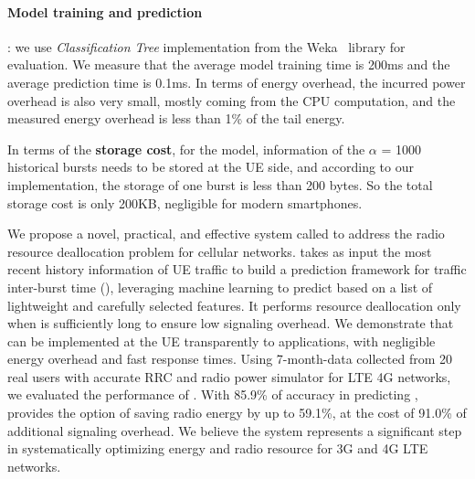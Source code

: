 \paragraph{Model training and prediction}: we use {\em Classification Tree} implementation from the Weka~\cite{weka} library for evaluation. We measure that the average model training time is 200ms and the average prediction time is 0.1ms. In terms of energy overhead, the incurred power overhead is also very small, mostly coming from the CPU computation, and the measured energy overhead is less than 1\% of the tail energy.

In terms of the {\bf storage cost}, for the \MostRecent model, information of the $\alpha$ = 1000 historical bursts needs to be stored at the UE side, and according to our implementation, the storage of one burst is less than 200 bytes. So the total storage cost is only 200KB, negligible for modern smartphones.

\label{sec:rp.summary}

We propose a novel, practical, and effective system called \NAMEFULL to address the radio resource deallocation problem for cellular networks. \NAME takes as input the most recent history information of UE traffic to build a prediction framework for traffic inter-burst time (\IBT), leveraging machine learning to predict \IBT based on a list of lightweight and carefully selected features. It performs resource deallocation only when \IBT is sufficiently long to ensure low signaling overhead. We demonstrate that \NAME can be implemented at the UE transparently to applications, with negligible energy overhead and fast response times. Using 7-month-data collected from 20 real users with accurate RRC and radio power simulator for LTE 4G networks, we evaluated the performance of \NAME. With 85.9\% of accuracy in predicting \IBTS, \NAME provides the option of saving radio energy by up to 59.1\%, at the cost of 91.0\% of additional signaling overhead. We believe the \NAME system represents a significant step in systematically optimizing energy and radio resource for 3G and 4G LTE networks.
